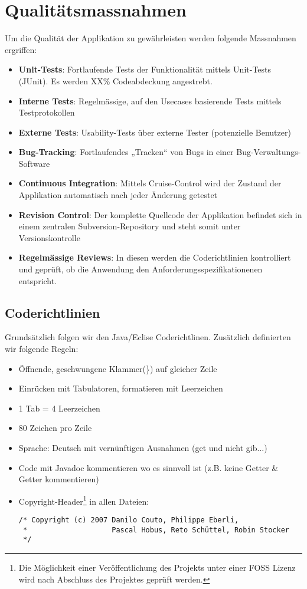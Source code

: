 \documentclass[a4paper,12pt,halfparskip,DIV14]{scrreprt}
\begin{document}
\section{Qualitätsmassnahmen}

Um die Qualität der Applikation zu gewährleisten werden folgende Massnahmen ergriffen:
\begin{itemize}
	\item \textbf{Unit-Tests}: Fortlaufende Tests der Funktionalität mittels Unit-Tests (JUnit). Es werden XX\% Codeabdeckung angestrebt.
	\item \textbf{Interne Tests}: Regelmässige, auf den Usecases basierende Tests mittels Testprotokollen
	\item \textbf{Externe Tests}: Usability-Tests über externe Tester (potenzielle Benutzer)
	\item \textbf{Bug-Tracking}: Fortlaufendes „Tracken“ von Bugs in einer Bug-Verwaltungs-Software
	\item \textbf{Continuous Integration}: Mittels Cruise-Control wird der Zustand der Applikation automatisch nach jeder Änderung getestet
	\item \textbf{Revision Control}: Der komplette Quellcode der Applikation befindet sich in einem zentralen Subversion-Repository und steht somit unter Versionskontrolle
	\item \textbf{Regelmässige Reviews}: In diesen werden die Coderichtlinien kontrolliert und geprüft, ob die Anwendung den Anforderungsspezifikationenen entspricht. 
\end{itemize}

\subsection{Coderichtlinien}\label{sub:coderichtlinien} %
Grundsätzlich folgen wir den Java/Eclise Coderichtlinen. Zusätzlich definierten wir folgende Regeln:
\begin{itemize}
  \item Öffnende, geschwungene Klammer(\}) auf gleicher Zeile
  \item Einrücken mit Tabulatoren, formatieren mit Leerzeichen
  \item 1 Tab = 4 Leerzeichen
  \item 80 Zeichen pro Zeile
  \item Sprache: Deutsch mit vernünftigen Ausnahmen (get und nicht gib...)
  \item Code mit Javadoc kommentieren wo es sinnvoll ist (z.B. keine Getter \& Getter kommentieren)
  \item Copyright-Header\footnote{Die Möglichkeit einer Veröffentlichung des Projekts unter einer FOSS Lizenz wird nach Abschluss des Projektes geprüft werden.} in allen Dateien:
    \begin{verbatim}
/* Copyright (c) 2007 Danilo Couto, Philippe Eberli,
 *                    Pascal Hobus, Reto Schüttel, Robin Stocker
 */
    \end{verbatim}
\end{itemize}
\end{document}
